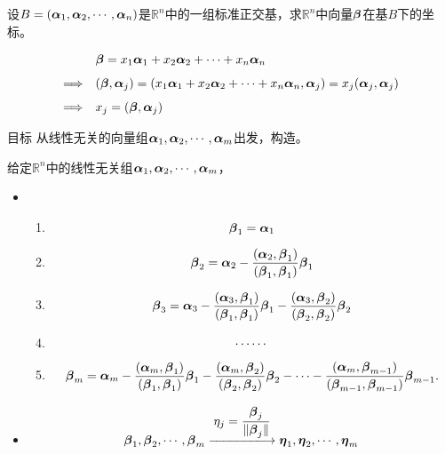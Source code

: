 \begin{frame}
  
  \begin{li}
    设$B=(\boldsymbol{\alpha}_1,\boldsymbol{\alpha}_2,\cdots,\boldsymbol{\alpha}_n)$是$\mathbb R^n$中的一组标准正交基，求$\mathbb R^n$中向量$\boldsymbol{\beta}$在基$B$下的坐标。
  \end{li}
  \begin{jie}
    $$
    \begin{array}{rl}
      & \boldsymbol{\beta}=x_1\boldsymbol{\alpha}_1+x_2\boldsymbol{\alpha}_2+\cdots+x_n\boldsymbol{\alpha}_n\\[0.1in]
      \Longrightarrow&   (\boldsymbol{\beta},\boldsymbol{\alpha}_j)=(x_1\boldsymbol{\alpha}_1+x_2\boldsymbol{\alpha}_2+\cdots+x_n\boldsymbol{\alpha}_n,\boldsymbol{\alpha}_j)=x_j(\boldsymbol{\alpha}_j,\boldsymbol{\alpha}_j)\\[0.1in]
      \Longrightarrow& \displaystyle x_j =  (\boldsymbol{\beta},\boldsymbol{\alpha}_j) 
    \end{array}
    $$
  \end{jie}
  
\end{frame}


\begin{frame}
  
  \begin{block}{目标}
    从线性无关的向量组$\boldsymbol{\alpha}_1,\boldsymbol{\alpha}_2,\cdots,\boldsymbol{\alpha}_m$出发，构造。
  \end{block}
  
\end{frame}


\begin{frame}
  
  给定$\mathbb R^n$中的线性无关组$\boldsymbol{\alpha}_1,\boldsymbol{\alpha}_2,\cdots,\boldsymbol{\alpha}_m$， 
  \begin{itemize}
  \item {}
    \begin{enumerate}
    \item$$\boldsymbol{\beta}_1=\boldsymbol{\alpha}_1$$
    \item
      $$
      \boldsymbol{\beta}_2=\boldsymbol{\alpha}_2-\frac{(\boldsymbol{\alpha}_2,\boldsymbol{\beta}_1)}{(\boldsymbol{\beta}_1,\boldsymbol{\beta}_1)}\boldsymbol{\beta}_1
      $$
    \item
      $$
      \boldsymbol{\beta}_3=\boldsymbol{\alpha}_3-\frac{(\boldsymbol{\alpha}_3,\boldsymbol{\beta}_1)}{(\boldsymbol{\beta}_1,\boldsymbol{\beta}_1)}\boldsymbol{\beta}_1
      -\frac{(\boldsymbol{\alpha}_3,\boldsymbol{\beta}_2)}{(\boldsymbol{\beta}_2,\boldsymbol{\beta}_2)}\boldsymbol{\beta}_2
      $$
    \item  $$\cdots\cdots$$
    \item
      $$
      \boldsymbol{\beta}_m=\boldsymbol{\alpha}_m-\frac{(\boldsymbol{\alpha}_m,\boldsymbol{\beta}_1)}{(\boldsymbol{\beta}_1,\boldsymbol{\beta}_1)}\boldsymbol{\beta}_1
      -\frac{(\boldsymbol{\alpha}_m,\boldsymbol{\beta}_2)}{(\boldsymbol{\beta}_2,\boldsymbol{\beta}_2)}\boldsymbol{\beta}_2
      -\cdots
      -\frac{(\boldsymbol{\alpha}_m,\boldsymbol{\beta}_{m-1})}{(\boldsymbol{\beta}_{m-1},\boldsymbol{\beta}_{m-1})}\boldsymbol{\beta}_{m-1}.
      $$
    \end{enumerate}  
  \item {}
    $$
    \betabd_1, \betabd_2, \cd, \betabd_m \xlongrightarrow[]{\ds \eta_j=\frac{\betabd_j}{\|\betabd_j\|}}
    \etabd_1, \etabd_2, \cd, \etabd_m
    $$
  \end{itemize}  
  
\end{frame}


